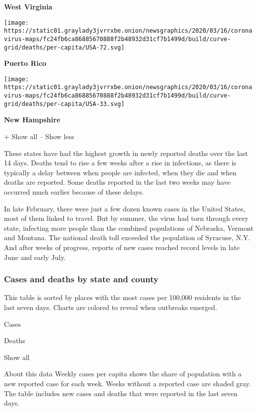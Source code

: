 \textbf{West Virginia}

\href{https://www.nytimes3xbfgragh.onion/interactive/2020/us/puerto-rico-coronavirus-cases.html}{}

\texttt{[image: https://static01.graylady3jvrrxbe.onion/newsgraphics/2020/03/16/coronavirus-maps/fc24fb6ca86885670888f2b48932d31cf7b1499d/build/curve-grid/deaths/per-capita/USA-72.svg]}

\textbf{Puerto Rico}

\href{https://www.nytimes3xbfgragh.onion/interactive/2020/us/new-hampshire-coronavirus-cases.html}{}

\texttt{[image: https://static01.graylady3jvrrxbe.onion/newsgraphics/2020/03/16/coronavirus-maps/fc24fb6ca86885670888f2b48932d31cf7b1499d/build/curve-grid/deaths/per-capita/USA-33.svg]}

\textbf{New Hampshire}

+ Show all -- Show less

These states have had the highest growth in newly reported deaths over
the last 14 days. Deaths tend to rise a few weeks after a rise in
infections, as there is typically a delay between when people are
infected, when they die and when deaths are reported. Some deaths
reported in the last two weeks may have occurred much earlier because of
these delays.

In late February, there were just a few dozen known cases in the United
States, most of them linked to travel. But by summer, the virus had torn
through every state, infecting more people than the combined populations
of Nebraska, Vermont and Montana. The national death toll exceeded the
population of Syracuse, N.Y. And after weeks of progress, reports of new
cases reached record levels in late June and early July.

\hypertarget{cases-and-deaths-by-state-and-county}{%
\subsubsection{Cases and deaths by state and
county}\label{cases-and-deaths-by-state-and-county}}

This table is sorted by places with the most cases per 100,000 residents
in the last seven days. Charts are colored to reveal when outbreaks
emerged.

Cases

Deaths

Show all

About this data Weekly cases per capita shows the share of population
with a new reported case for each week. Weeks without a reported case
are shaded gray. The table includes new cases and deaths that were
reported in the last seven days.

